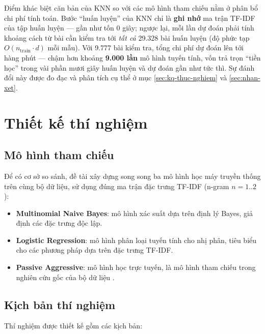 Điểm khác biệt căn bản của KNN so với các mô hình tham chiếu nằm ở phân bổ chi phí tính toán. Bước ``huấn luyện'' của KNN chỉ là \textbf{ghi nhớ} ma trận TF-IDF của tập huấn luyện --- gần như tốn 0 giây; ngược lại, mỗi lần dự đoán phải tính khoảng cách từ bài cần kiểm tra tới \textit{tất cả} 29.328 bài huấn luyện (độ phức tạp $O(n_{\text{train}} \cdot d)$ mỗi mẫu). Với 9.777 bài kiểm tra, tổng chi phí dự đoán lên tới hàng phút --- chậm hơn khoảng \textbf{9.000 lần} mô hình tuyến tính, vốn trả trọn ``tiền học'' trong vài phần mươi giây huấn luyện và dự đoán gần như tức thì. Sự đánh đổi này được đo đạc và phân tích cụ thể ở mục \ref{sec:kq-thuc-nghiem} và \ref{sec:nhan-xet}.

\section{Thiết kế thí nghiệm}

\subsection{Mô hình tham chiếu}

Để có cơ sở so sánh, đề tài xây dựng song song ba mô hình học máy truyền thống trên cùng bộ dữ liệu, sử dụng đúng ma trận đặc trưng TF-IDF (n-gram $n = 1..2$):

\begin{itemize}
    \item \textbf{Multinomial Naive Bayes}: mô hình xác suất dựa trên định lý Bayes, giả định các đặc trưng độc lập.
    \item \textbf{Logistic Regression}: mô hình phân loại tuyến tính cho nhị phân, tiêu biểu cho các phương pháp dựa trên đặc trưng TF-IDF.
    \item \textbf{Passive Aggressive}: mô hình học trực tuyến, là mô hình tham chiếu trong nghiên cứu gốc của bộ dữ liệu \cite{ahmed2017}.
\end{itemize}

\subsection{Kịch bản thí nghiệm}

Thí nghiệm được thiết kế gồm các kịch bản:

